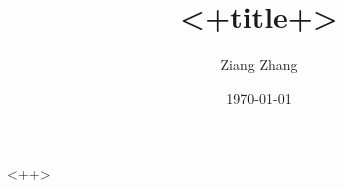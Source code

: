 \documentclass[12pt, aspectratio=169]{beamer}
\author{Ziang Zhang}
\date{\today}
\title{<+title+>}
\begin{document}
\begin{frame}
  \titlepage
\end{frame}

<++>
\end{document}
